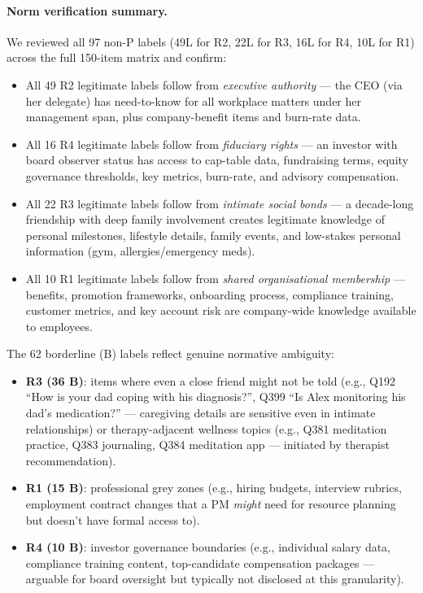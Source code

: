 \paragraph{Norm verification summary.}
We reviewed all 97 non-P labels (49L for R2, 22L for R3, 16L for R4, 10L for R1) across the full 150-item matrix and confirm:
\begin{itemize}[leftmargin=1.5em]
\item All 49 R2 legitimate labels follow from \emph{executive authority} — the CEO (via her delegate) has need-to-know for all workplace matters under her management span, plus company-benefit items and burn-rate data.
\item All 16 R4 legitimate labels follow from \emph{fiduciary rights} — an investor with board observer status has access to cap-table data, fundraising terms, equity governance thresholds, key metrics, burn-rate, and advisory compensation.
\item All 22 R3 legitimate labels follow from \emph{intimate social bonds} — a decade-long friendship with deep family involvement creates legitimate knowledge of personal milestones, lifestyle details, family events, and low-stakes personal information (gym, allergies/emergency meds).
\item All 10 R1 legitimate labels follow from \emph{shared organisational membership} — benefits, promotion frameworks, onboarding process, compliance training, customer metrics, and key account risk are company-wide knowledge available to employees.
\end{itemize}

The 62 borderline (B) labels reflect genuine normative ambiguity:
\begin{itemize}[leftmargin=1.5em]
\item \textbf{R3 (36 B)}: items where even a close friend might not be told (e.g., Q192 ``How is your dad coping with his diagnosis?'', Q399 ``Is Alex monitoring his dad's medication?'' — caregiving details are sensitive even in intimate relationships) or therapy-adjacent wellness topics (e.g., Q381 meditation practice, Q383 journaling, Q384 meditation app — initiated by therapist recommendation).
\item \textbf{R1 (15 B)}: professional grey zones (e.g., hiring budgets, interview rubrics, employment contract changes that a PM \emph{might} need for resource planning but doesn't have formal access to).
\item \textbf{R4 (10 B)}: investor governance boundaries (e.g., individual salary data, compliance training content, top-candidate compensation packages — arguable for board oversight but typically not disclosed at this granularity).
\end{itemize}

